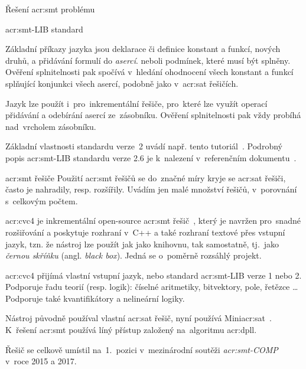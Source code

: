 \documentclass[thesis=M,czech]{FITthesis}[2012/06/26]
\newcommand{\acrlabel}[1]{acr:#1}
\newcommand{\acr}[1]{\acrshort{\acrlabel{#1}}}
\newcommand{\hl}[1]{\textit{#1}}
\newcommand{\name}[1]{\hl{#1}}
\newcommand{\cit}[1]{\cite{#1}}
\begin{document}
\begin{section}{Řešení \acr{smt} problému}
\begin{subsection}{\acr{smt}-LIB standard}
\bigskip

Základní příkazy jazyka jsou deklarace či definice konstant a funkcí,
nových druhů, a přidávání formulí do \name{asercí}.
neboli podmínek, které musí být splněny.
Ověření splnitelnosti pak spočívá v~hledání ohodnocení
všech konstant a funkcí splňující konjunkci všech asercí,
podobně jako v~\acr{sat} řešičích.

Jazyk lze použít i~pro~inkrementální řešiče,
pro~které lze využít operací přidávání a odebírání
asercí ze~zásobníku.
Ověření splnitelnosti pak vždy probíhá
nad~vrcholem zásobníku.

Základní vlastnosti standardu verze~2
uvádí např. tento tutoriál~\cit{smtlib-tutorial-art}.
Podrobný popis \acr{smt}-LIB standardu verze 2.6
je k~nalezení v~referenčním dokumentu~\cit{smtlib-reference-art}.
\end{subsection} %


\begin{subsection}{\acr{smt} řešiče}\label{ss:search:smt:solver}
Použití \acr{smt} řešičů se do~značné míry kryje se \acr{sat} řešiči,
často je nahradily, resp. rozšířily.
Uvádím jen malé množství řešičů,
v~porovnání s~celkovým počtem.


\begin{paragraph}{\acr{cvc}4}\label{p:search:smt:solver:cvc4}
je inkrementální open-source \acr{smt} řešič~\cit{cvc4}\cit{cvc4-art},
který je navržen pro~snadné rozšiřování
a poskytuje rozhraní v~C++
a také rozhraní textové přes vstupní jazyk,
tzn. že nástroj lze použít jak jako knihovnu,
tak samostatně,
tj.~jako \name{černou skříňku} (angl. \name{black box}).
Jedná se o~poměrně rozsáhlý projekt.

\acr{cvc}4 přijímá vlastní vstupní jazyk,
nebo standard \acr{smt}-LIB verze 1 nebo 2.
Podporuje řadu teorií (resp. logik):
číselné aritmetiky, bitvektory, pole, řetězce \dots
Podporuje také kvantifikátory
a nelineární logiky.

Nástroj původně používal vlastní \acr{sat} řešič,
nyní používá Mini\acr{sat}~\cit{cvc4-art}.
K~řešení \acr{smt} používá líný přístup
založený na~algoritmu \acr{dpll}.

Řešič se celkově umístil na~1.~pozici
v~mezinárodní soutěži
\name{\acr{smt}-COMP}~\cit{smtcomp}\cit{smtcomp-art}
v~roce 2015 a 2017.
\end{paragraph} %


\end{subsection}
\end{section}
\end{document}
